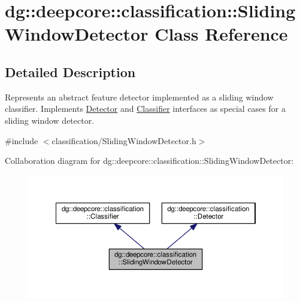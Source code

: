 \hypertarget{classdg_1_1deepcore_1_1classification_1_1_sliding_window_detector}{}\section{dg\+:\+:deepcore\+:\+:classification\+:\+:Sliding\+Window\+Detector Class Reference}
\label{classdg_1_1deepcore_1_1classification_1_1_sliding_window_detector}


\subsection{Detailed Description}
Represents an abstract feature detector implemented as a sliding window classifier. Implements \hyperlink{classdg_1_1deepcore_1_1classification_1_1_detector}{Detector} and \hyperlink{classdg_1_1deepcore_1_1classification_1_1_classifier}{Classifier} interfaces as special cases for a sliding window detector. 

{\ttfamily \#include $<$classification/\+Sliding\+Window\+Detector.\+h$>$}



Collaboration diagram for dg\+:\+:deepcore\+:\+:classification\+:\+:Sliding\+Window\+Detector\+:
\nopagebreak
\begin{figure}[H]
\begin{center}
\leavevmode
\includegraphics[width=350pt]{classdg_1_1deepcore_1_1classification_1_1_sliding_window_detector__coll__graph}
\end{center}
\end{figure}
